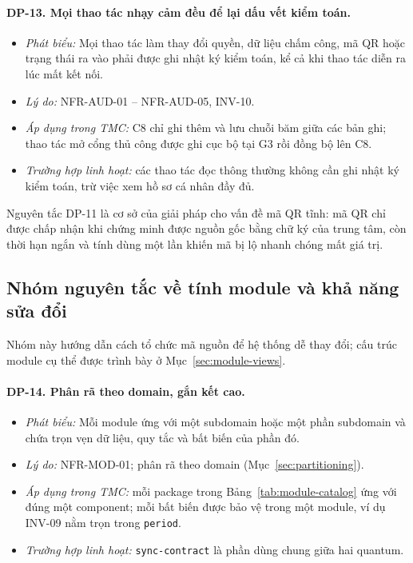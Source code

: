 \paragraph{DP-13. Mọi thao tác nhạy cảm đều để lại dấu vết kiểm toán.}\label{dp:13}
\begin{itemize}
    \item \textit{Phát biểu:} Mọi thao tác làm thay đổi quyền, dữ liệu chấm công, mã QR hoặc trạng thái ra vào phải được ghi nhật ký kiểm toán, kể cả khi thao tác diễn ra lúc mất kết nối.
    \item \textit{Lý do:} NFR-AUD-01 -- NFR-AUD-05, INV-10.
    \item \textit{Áp dụng trong TMC:} C8 chỉ ghi thêm và lưu chuỗi băm giữa các bản ghi; thao tác mở cổng thủ công được ghi cục bộ tại G3 rồi đồng bộ lên C8.
    \item \textit{Trường hợp linh hoạt:} các thao tác đọc thông thường không cần ghi nhật ký kiểm toán, trừ việc xem hồ sơ cá nhân đầy đủ.
\end{itemize}

Nguyên tắc DP-11 là cơ sở của giải pháp cho vấn đề mã QR tĩnh: mã QR chỉ được chấp nhận khi chứng minh được nguồn gốc bằng chữ ký của trung tâm, còn thời hạn ngắn và tính dùng một lần khiến mã bị lộ nhanh chóng mất giá trị.

\subsection{Nhóm nguyên tắc về tính module và khả năng sửa đổi}\label{sec:dp-modularity}
Nhóm này hướng dẫn cách tổ chức mã nguồn để hệ thống dễ thay đổi; cấu trúc module cụ thể được trình bày ở Mục~\ref{sec:module-views}.

\paragraph{DP-14. Phân rã theo domain, gắn kết cao.}\label{dp:14}
\begin{itemize}
    \item \textit{Phát biểu:} Mỗi module ứng với một subdomain hoặc một phần subdomain và chứa trọn vẹn dữ liệu, quy tắc và bất biến của phần đó.
    \item \textit{Lý do:} NFR-MOD-01; phân rã theo domain (Mục~\ref{sec:partitioning}).
    \item \textit{Áp dụng trong TMC:} mỗi package trong Bảng~\ref{tab:module-catalog} ứng với đúng một component; mỗi bất biến được bảo vệ trong một module, ví dụ INV-09 nằm trọn trong \texttt{period}.
    \item \textit{Trường hợp linh hoạt:} \texttt{sync-contract} là phần dùng chung giữa hai quantum.
\end{itemize}

